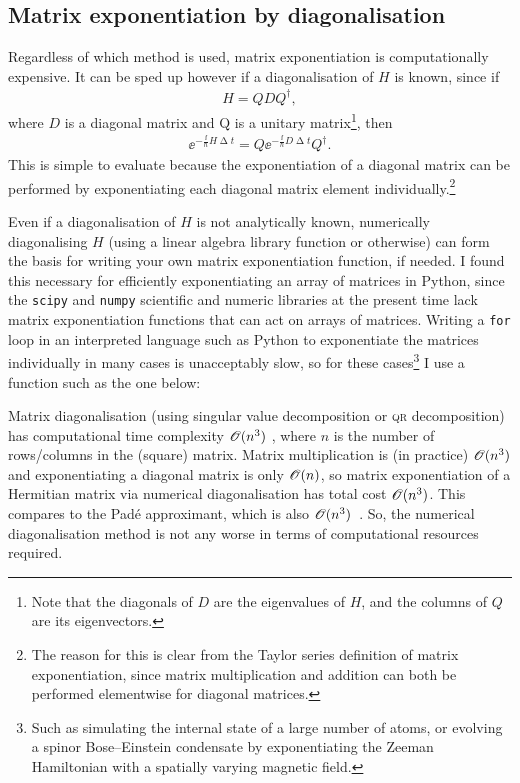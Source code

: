 \subsection{Matrix exponentiation by diagonalisation}\label{sec:matrix_exp_diagonalisation}
Regardless of which method is used, matrix exponentiation is computationally expensive. It can be sped up however if a diagonalisation of $H$ is known, since if
\begin{align}
H = QDQ^\dagger,
\end{align}
where $D$ is a diagonal matrix and Q is a unitary matrix\footnote{Note that the diagonals of $D$ are the eigenvalues of $H$, and the columns of $Q$ are its eigenvectors.}, then
\begin{align}\label{eq:diagonal_expm}
\ee^{-\frac \ii \hbar H \upDelta t} = Q \ee^{-\frac \ii \hbar D \upDelta t} Q^\dagger.
\end{align}
This is simple to evaluate because the exponentiation of a diagonal matrix can be performed by exponentiating each diagonal matrix element individually.\footnote{The reason for this is clear from the Taylor series definition of matrix exponentiation, since matrix multiplication and addition can both be performed elementwise for diagonal matrices.}

Even if a diagonalisation of $H$ is not analytically known, numerically diagonalising $H$ (using a linear algebra library function or otherwise) can form the basis for writing your own matrix exponentiation function, if needed. I found this necessary for efficiently exponentiating an array of matrices in Python, since the \texttt{scipy} and \texttt{numpy} scientific and numeric libraries at the present time lack matrix exponentiation functions that can act on arrays of matrices. Writing a \texttt{for} loop in an interpreted language such as Python to exponentiate the matrices individually in many cases is unacceptably slow, so for these cases\footnote{Such as simulating the internal state of a large number of atoms, or evolving a spinor Bose--Einstein condensate by exponentiating the Zeeman Hamiltonian with a spatially varying magnetic field.} I use a function such as the one below:


Matrix diagonalisation (using singular value decomposition or 
\textsc{qr} decomposition) has computational time complexity $\mathscr{O}(n^3)$ , where $n$ is the number of rows/columns in the (square) matrix. Matrix multiplication is (in practice) $\mathscr{O}(n^3)$ and exponentiating a diagonal matrix is only $\mathscr{O}(n) $, so matrix exponentiation of a Hermitian matrix via numerical diagonalisation has total cost $\mathscr{O}(n^3)$. This compares to the Pad\'e approximant, which is also $\mathscr{O}(n^3)$~\cite{moler_nineteen_2003}. So, the numerical diagonalisation method is not any worse in terms of computational resources required.

